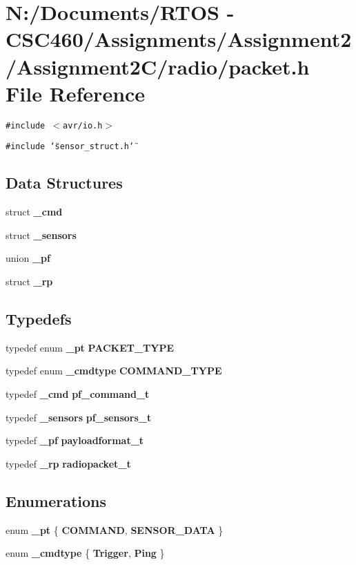 \section{N:/Documents/RTOS - CSC460/Assignments/Assignment2/Assignment2C/radio/packet.h File Reference}
\label{packet_8h}
{\tt \#include $<$avr/io.h$>$}\par
{\tt \#include \char`\"{}sensor\_\-struct.h\char`\"{}}\par
\subsection*{Data Structures}
\begin{CompactItemize}
\item 
struct {\bf \_\-cmd}
\item 
struct {\bf \_\-sensors}
\item 
union {\bf \_\-pf}
\item 
struct {\bf \_\-rp}
\end{CompactItemize}
\subsection*{Typedefs}
\begin{CompactItemize}
\item 
typedef enum {\bf \_\-pt} {\bf PACKET\_\-TYPE}
\item 
typedef enum {\bf \_\-cmdtype} {\bf COMMAND\_\-TYPE}
\item 
typedef {\bf \_\-cmd} {\bf pf\_\-command\_\-t}
\item 
typedef {\bf \_\-sensors} {\bf pf\_\-sensors\_\-t}
\item 
typedef {\bf \_\-pf} {\bf payloadformat\_\-t}
\item 
typedef {\bf \_\-rp} {\bf radiopacket\_\-t}
\end{CompactItemize}
\subsection*{Enumerations}
\begin{CompactItemize}
\item 
enum {\bf \_\-pt} \{ {\bf COMMAND}, 
{\bf SENSOR\_\-DATA}
 \}
\item 
enum {\bf \_\-cmdtype} \{ {\bf Trigger}, 
{\bf Ping}
 \}
\end{CompactItemize}


